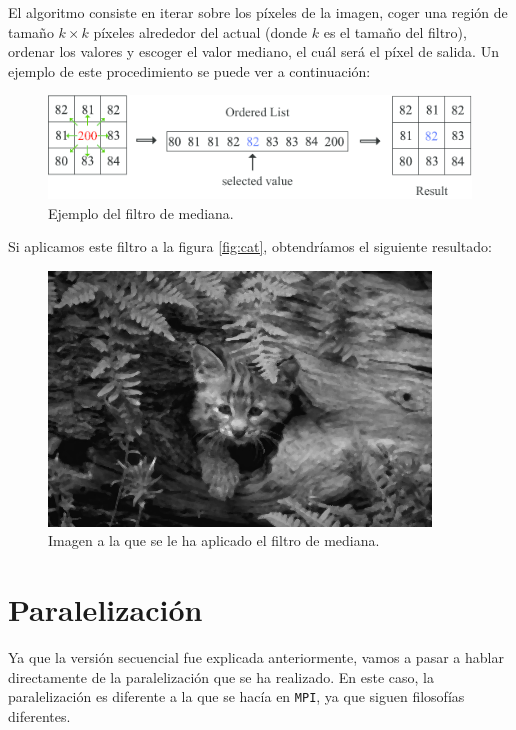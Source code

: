 \documentclass[11pt,a4paper]{article}
\begin{document}
El algoritmo consiste en iterar sobre los píxeles de la imagen, coger una región de tamaño
$k \times k$ píxeles alrededor del actual (donde $k$ es el tamaño del filtro), ordenar
los valores y escoger el valor mediano, el cuál será el píxel de salida. Un ejemplo de este
procedimiento se puede ver a continuación:

\begin{figure}[H]
  \centering
  \includegraphics[scale=0.4]{img/median-filter.png}
  \caption{Ejemplo del filtro de mediana.}
  \label{fig:median-filter}
\end{figure}

Si aplicamos este filtro a la figura \ref{fig:cat}, obtendríamos el siguiente resultado:

\begin{figure}[H]
  \centering
  \includegraphics[scale=0.6]{img/filtered-cat}
  \caption{Imagen a la que se le ha aplicado el filtro de mediana.}
  \label{fig:filtered-cat}
\end{figure}

\section{Paralelización}

Ya que la versión secuencial fue explicada anteriormente, vamos a pasar a hablar directamente
de la paralelización que se ha realizado. En este caso, la paralelización es diferente a la que
se hacía en \texttt{MPI}, ya que siguen filosofías diferentes.
\end{document}
